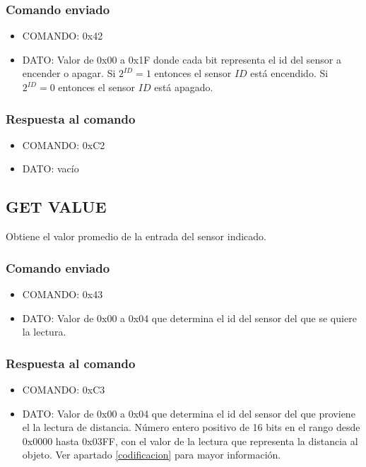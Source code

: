 \documentclass[a4paper,10pt]{article}
\begin{document}
\subsubsection*{Comando enviado}

\begin{itemize}
	\item{COMANDO:} 0x42
	\item{DATO:} Valor de 0x00 a 0x1F donde cada bit representa el id del sensor a encender o apagar.
	Si $2^{ID} = 1$ entonces el sensor $ID$ est\'a encendido.
	Si $2^{ID} = 0$ entonces el sensor $ID$ est\'a apagado.
\end{itemize}

\subsubsection*{Respuesta al comando}

\begin{itemize}
	\item{COMANDO:} 0xC2
	\item{DATO:} vac\'io
\end{itemize}

\subsection{GET VALUE}
\label{get_value_fs}

Obtiene el valor promedio de la entrada del sensor indicado.

\subsubsection*{Comando enviado}

\begin{itemize}
	\item{COMANDO:} 0x43
	\item{DATO:} Valor de 0x00 a 0x04 que determina el id del sensor del que se quiere la lectura.
\end{itemize}

\subsubsection*{Respuesta al comando}

\begin{itemize}
	\item{COMANDO:} 0xC3
	\item{DATO:} Valor de 0x00 a 0x04 que determina el id del sensor del que proviene el la lectura de distancia.
		N\'umero entero positivo de 16 bits en el rango desde 0x0000 hasta 0x03FF, con el valor de la lectura que representa la distancia al objeto.
		Ver apartado \ref{codificacion} para mayor informaci\'on.
\end{itemize}
\end{document}
